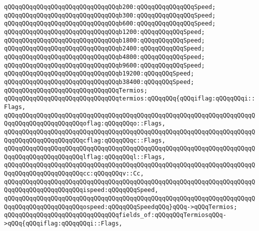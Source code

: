 \verb|qQQqqQQqqQQqqQQqqQQqqQQqqQQqqQQqb200:qQQqqQQqqQQqqQQqSpeed;|\newline
\verb|qQQqqQQqqQQqqQQqqQQqqQQqqQQqqQQqb300:qQQqqQQqqQQqqQQqSpeed;|\newline
\verb|qQQqqQQqqQQqqQQqqQQqqQQqqQQqqQQqb600:qQQqqQQqqQQqqQQqSpeed;|\newline
\verb|qQQqqQQqqQQqqQQqqQQqqQQqqQQqqQQqb1200:qQQqqQQqqQQqSpeed;|\newline
\verb|qQQqqQQqqQQqqQQqqQQqqQQqqQQqqQQqb1800:qQQqqQQqqQQqSpeed;|\newline
\verb|qQQqqQQqqQQqqQQqqQQqqQQqqQQqqQQqb2400:qQQqqQQqqQQqSpeed;|\newline
\verb|qQQqqQQqqQQqqQQqqQQqqQQqqQQqqQQqb4800:qQQqqQQqqQQqSpeed;|\newline
\verb|qQQqqQQqqQQqqQQqqQQqqQQqqQQqqQQqb9600:qQQqqQQqqQQqSpeed;|\newline
\verb|qQQqqQQqqQQqqQQqqQQqqQQqqQQqqQQqb19200:qQQqqQQqSpeed;|\newline
\verb|qQQqqQQqqQQqqQQqqQQqqQQqqQQqqQQqb38400:qQQqqQQqSpeed;|\newline
\newline
\verb|qQQqqQQqqQQqqQQqqQQqqQQqqQQqqQQqTermios;|\newline
\newline
\verb|qQQqqQQqqQQqqQQqqQQqqQQqqQQqqQQqtermios:qQQqqQQq{qQQqiflag:qQQqqQQqi::Flags,|\newline
\verb|qQQqqQQqqQQqqQQqqQQqqQQqqQQqqQQqqQQqqQQqqQQqqQQqqQQqqQQqqQQqqQQqqQQqqQQqqQQqqQQqqQQqqQQqqQQqoflag:qQQqqQQqo::Flags,|\newline
\verb|qQQqqQQqqQQqqQQqqQQqqQQqqQQqqQQqqQQqqQQqqQQqqQQqqQQqqQQqqQQqqQQqqQQqqQQqqQQqqQQqqQQqqQQqqQQqcflag:qQQqqQQqc::Flags,|\newline
\verb|qQQqqQQqqQQqqQQqqQQqqQQqqQQqqQQqqQQqqQQqqQQqqQQqqQQqqQQqqQQqqQQqqQQqqQQqqQQqqQQqqQQqqQQqqQQqlflag:qQQqqQQql::Flags,|\newline
\verb|qQQqqQQqqQQqqQQqqQQqqQQqqQQqqQQqqQQqqQQqqQQqqQQqqQQqqQQqqQQqqQQqqQQqqQQqqQQqqQQqqQQqqQQqqQQqcc:qQQqqQQqv::Cc,|\newline
\verb|qQQqqQQqqQQqqQQqqQQqqQQqqQQqqQQqqQQqqQQqqQQqqQQqqQQqqQQqqQQqqQQqqQQqqQQqqQQqqQQqqQQqqQQqqQQqispeed:qQQqqQQqSpeed,|\newline
\verb|qQQqqQQqqQQqqQQqqQQqqQQqqQQqqQQqqQQqqQQqqQQqqQQqqQQqqQQqqQQqqQQqqQQqqQQqqQQqqQQqqQQqqQQqqQQqospeed:qQQqqQQqSpeedqQQq}qQQq->qQQqTermios;|\newline
\newline
\verb|qQQqqQQqqQQqqQQqqQQqqQQqqQQqqQQqfields_of:qQQqqQQqTermiosqQQq->qQQq{qQQqiflag:qQQqqQQqi::Flags,|\newline
